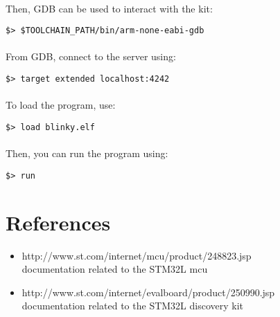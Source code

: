 \documentclass[a4paper, 11pt]{article}
\begin{document}
\paragraph{}
Then, GDB can be used to interact with the kit:\\
\begin{small}
\begin{lstlisting}[frame=tb]
$> $TOOLCHAIN_PATH/bin/arm-none-eabi-gdb
\end{lstlisting}
\end{small}

\paragraph{}
From GDB, connect to the server using:\\
\begin{small}
\begin{lstlisting}[frame=tb]
$> target extended localhost:4242
\end{lstlisting}
\end{small}

\paragraph{}
To load the program, use:\\
\begin{small}
\begin{lstlisting}[frame=tb]
$> load blinky.elf
\end{lstlisting}
\end{small}

\paragraph{}
Then, you can run the program using:\\
\begin{small}
\begin{lstlisting}[frame=tb]
$> run
\end{lstlisting}
\end{small}


\newpage
\section{References}
\begin{itemize}
\item http://www.st.com/internet/mcu/product/248823.jsp\\
  documentation related to the STM32L mcu
\item http://www.st.com/internet/evalboard/product/250990.jsp\\
  documentation related to the STM32L discovery kit
\end{itemize}
\end{document}
